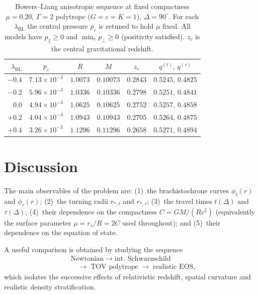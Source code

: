 \documentclass[
  aps,
  prd,
  twocolumn,
  nofootinbib,
  superscriptaddress,
  longbibliography
]{revtex4-2}
\begin{document}
\begin{table}[tb]
\centering
\caption{Bowers--Liang anisotropic sequence at fixed compactness
$\mu=0.20$, $\Gamma=2$ polytrope ($G=c=K=1$), $\Delta=90^\circ$. For
each $\lambda_{\mathrm{BL}}$ the central pressure $p_c$ is retuned to
hold $\mu$ fixed. All models have $p_\parallel\ge0$ and
$\min_r p_\perp\ge0$ (positivity satisfied). $z_c$ is the central
gravitational redshift.}
\label{tab:bl}
\begin{tabular}{rccccc}
\hline\hline
$\lambda_{\mathrm{BL}}$ & $p_c$ & $R$ & $M$ & $z_c$ & $q^{(t)},\,q^{(\tau)}$ \\
\hline
$-0.4$ & $7.13\times10^{-3}$ & $1.0073$ & $0.10073$ & $0.2843$ & $0.5245,\,0.4825$ \\
$-0.2$ & $5.96\times10^{-3}$ & $1.0336$ & $0.10336$ & $0.2798$ & $0.5251,\,0.4841$ \\
$0.0$  & $4.94\times10^{-3}$ & $1.0625$ & $0.10625$ & $0.2752$ & $0.5257,\,0.4858$ \\
$+0.2$ & $4.04\times10^{-3}$ & $1.0943$ & $0.10943$ & $0.2705$ & $0.5264,\,0.4875$ \\
$+0.4$ & $3.26\times10^{-3}$ & $1.1296$ & $0.11296$ & $0.2658$ & $0.5271,\,0.4894$ \\
\hline\hline
\end{tabular}
\end{table}

\section{Discussion}

The main observables of the problem are: (1)~the brachistochrone
curves $\phi_t(r)$ and $\phi_\tau(r)$; (2)~the turning radii
$r_{*,t}$ and $r_{*,\tau}$; (3)~the travel times $t(\Delta)$ and
$\tau(\Delta)$; (4)~their dependence on the compactness
$C=GM/(Rc^2)$ (equivalently the surface parameter $\mu=r_s/R=2C$ used
throughout); and (5)~their dependence on the equation of state.

A useful comparison is obtained by studying the sequence
\begin{align}
&\text{Newtonian}
\;\longrightarrow\;
\text{int.\ Schwarzschild}
\nonumber\\
&\quad\longrightarrow\;
\text{TOV polytrope}
\;\longrightarrow\;
\text{realistic EOS},
\label{eq:sequence}
\end{align}
which isolates the successive effects of relativistic redshift,
spatial curvature and realistic density stratification.
\end{document}
